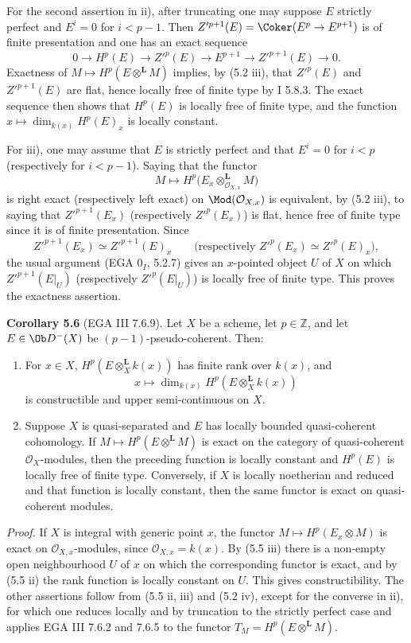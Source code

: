 For the second assertion in ii), after truncating one may suppose \(E\) strictly perfect and \(E^i=0\) for \(i<p-1\). Then \(Z'^{p+1}(E)=\Coker(E^p\to E^{p+1})\) is of finite presentation and one has an exact sequence
\[
0\to H^p(E)\to Z'^p(E)\to E^{p+1}\to Z'^{p+1}(E)\to0.
\]
Exactness of \(M\mapsto H^p(E\otimes^{\mathbf L}M)\) implies, by (5.2 iii), that \(Z'^{p}(E)\) and \(Z'^{p+1}(E)\) are flat, hence locally free of finite type by I 5.8.3. The exact sequence then shows that \(H^p(E)\) is locally free of finite type, and the function \(x\mapsto\dim_{k(x)}H^p(E)_x\) is locally constant.

For iii), one may assume that \(E\) is strictly perfect and that \(E^i=0\) for \(i<p\) (respectively for \(i<p-1\)). Saying that the functor
\[
 M\longmapsto H^p\bigl(E_x\otimes_{\mathcal O_{X,x}}^{\mathbf L}M\bigr)
\]
is right exact (respectively left exact) on \(\Mod(\mathcal O_{X,x})\) is equivalent, by (5.2 iii), to saying that \(Z'^{p+1}(E_x)\) (respectively \(Z'^p(E_x)\)) is flat, hence free of finite type since it is of finite presentation. Since
\[
 Z'^{p+1}(E_x)\simeq Z'^{p+1}(E)_x
 \qquad\text{(respectively }Z'^p(E_x)\simeq Z'^p(E)_x\text{)},
\]
the usual argument (EGA \(0_I\), 5.2.7) gives an \(x\)-pointed object \(U\) of \(X\) on which \(Z'^{p+1}(E|_U)\) (respectively \(Z'^p(E|_U)\)) is locally free of finite type. This proves the exactness assertion.

\textbf{Corollary 5.6} (EGA III 7.6.9). Let \(X\) be a scheme, let \(p\in\mathbb Z\), and let \(E\in\Ob D^{-}(X)\) be \((p-1)\)-pseudo-coherent. Then:
\begin{enumerate}[label=\roman*)]
\item For \(x\in X\), \(H^p(E\otimes_X^{\mathbf L}k(x))\) has finite rank over \(k(x)\), and
\[
 x\longmapsto \dim_{k(x)}H^p(E\otimes_X^{\mathbf L}k(x))
\]
is constructible and upper semi-continuous on \(X\).
\item Suppose \(X\) is quasi-separated and \(E\) has locally bounded quasi-coherent cohomology. If \(M\mapsto H^p(E\otimes^{\mathbf L}M)\) is exact on the category of quasi-coherent \(\mathcal O_X\)-modules, then the preceding function is locally constant and \(H^p(E)\) is locally free of finite type. Conversely, if \(X\) is locally noetherian and reduced and that function is locally constant, then the same functor is exact on quasi-coherent modules.
\end{enumerate}

\emph{Proof.} If \(X\) is integral with generic point \(x\), the functor \(M\mapsto H^p(E_x\otimes M)\) is exact on \(\mathcal O_{X,x}\)-modules, since \(\mathcal O_{X,x}=k(x)\). By (5.5 iii) there is a non-empty open neighbourhood \(U\) of \(x\) on which the corresponding functor is exact, and by (5.5 ii) the rank function is locally constant on \(U\). This gives constructibility. The other assertions follow from (5.5 ii, iii) and (5.2 iv), except for the converse in ii), for which one reduces locally and by truncation to the strictly perfect case and applies EGA III 7.6.2 and 7.6.5 to the functor \(T_M=H^p(E\otimes^{\mathbf L}M)\).

